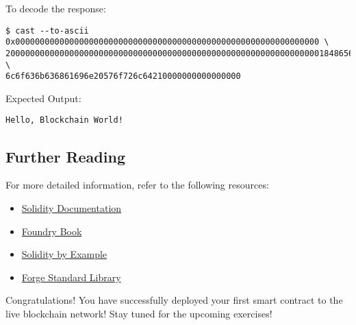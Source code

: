 \documentclass[12pt]{article}
\begin{document}
To decode the response:
\begin{verbatim}
$ cast --to-ascii 0x00000000000000000000000000000000000000000000000000000000000000 \
20000000000000000000000000000000000000000000000000000000000000001848656c6c6f2c2042 \
6c6f636b636861696e20576f726c64210000000000000000
\end{verbatim}

Expected Output:
\begin{verbatim}
Hello, Blockchain World!
\end{verbatim}

\subsection{Further Reading}

For more detailed information, refer to the following resources:

\begin{itemize}
    \item \href{https://docs.soliditylang.org/en/latest/}{Solidity Documentation}
    \item \href{https://book.getfoundry.sh/}{Foundry Book}
    \item \href{https://solidity-by-example.org/}{Solidity by Example}
    \item \href{https://github.com/foundry-rs/forge-std}{Forge Standard Library}
\end{itemize}
Congratulations! You have successfully deployed your first smart contract to the live blockchain network! Stay tuned for the upcoming exercises!
\end{document}
